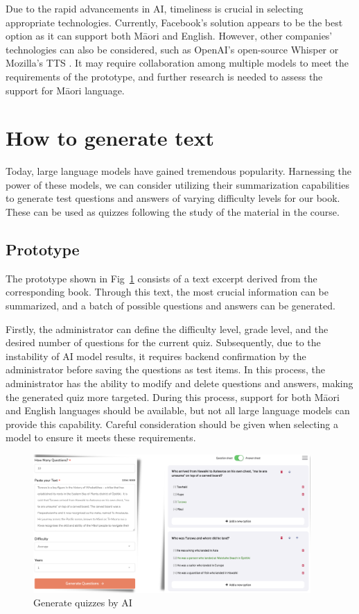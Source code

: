 Due to the rapid advancements in AI, timeliness is crucial in selecting appropriate technologies. 
Currently, Facebook's solution appears to be the best option as it can support both Māori and English. 
However, other companies' technologies can also be considered, such as OpenAI's open-source Whisper \autocite{Introduc57:online} or Mozilla's TTS \autocite{mozillaT63:online}. 
It may require collaboration among multiple models to meet the requirements of the prototype, and further research is needed to assess the support for Māori language.

\section{How to generate text}

Today, large language models have gained tremendous popularity. 
Harnessing the power of these models, we can consider utilizing their summarization capabilities to generate test questions and answers of varying difficulty levels for our book. 
These can be used as quizzes following the study of the material in the course.

\subsection{Prototype}

The prototype shown in Fig~\ref{s-3} consists of a text excerpt derived from the corresponding book. 
Through this text, the most crucial information can be summarized, and a batch of possible questions and answers can be generated. 

Firstly, the administrator can define the difficulty level, grade level, and the desired number of questions for the current quiz. 
Subsequently, due to the instability of AI model results, it requires backend confirmation by the administrator before saving the questions as test items. 
In this process, the administrator has the ability to modify and delete questions and answers, making the generated quiz more targeted. 
During this process, support for both Māori and English languages should be available, but not all large language models can provide this capability. 
Careful consideration should be given when selecting a model to ensure it meets these requirements.

\begin{figure}[htbp]
  \centerline{\includegraphics[width=300pt]{images/s-3.png}}
  \caption{Generate quizzes by AI}
  \label{s-3}
\end{figure}

